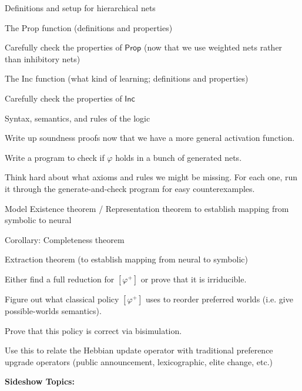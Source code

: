 \documentclass[12pt]{article}
\theoremstyle{definition}
\newcommand{\Prop}{\textsf{Prop}}
\newcommand{\Inc}{\textsf{Inc}}
\begin{document}
\begin{compactitem}
    \item[\textcolor{green}{\checkmark}] Definitions and setup for hierarchical nets
    \item[\textcolor{green}{\checkmark}] The Prop function (definitions and properties)
    \item[\textcolor{green}{\checkmark}] Carefully check the properties of $\Prop$ (now that we use weighted nets rather than inhibitory nets)
    \item[\textcolor{green}{\checkmark}] The Inc function (what kind of learning; definitions and properties)
    \item[\textcolor{green}{\checkmark}] Carefully check the properties of $\Inc$
    \item[\textcolor{green}{\checkmark}] Syntax, semantics, and rules of the logic
    \item Write up soundness proofs now that we have a more general activation function.
    \item Write a program to check if $\varphi$ holds in a bunch of generated nets.
    \item Think hard about what axioms and rules we might be missing.  For each one, run it through the generate-and-check program for easy counterexamples.
    \item Model Existence theorem / Representation theorem to establish mapping from symbolic to neural
    \item Corollary: Completeness theorem
    \item Extraction theorem (to establish mapping from neural to symbolic)
    \item Either find a full reduction for $[\varphi^+]$ or prove that it is irriducible.
    \item Figure out what classical policy $[\varphi^+]$ uses to reorder preferred worlds (i.e. give possible-worlds semantics).
    \item Prove that this policy is correct via bisimulation.
    \item Use this to relate the Hebbian update operator with traditional preference upgrade operators (public announcement, lexicographic, elite change, etc.)
\end{compactitem}

\textbf{\textcolor{myblue}{Sideshow Topics:}}
\end{document}
